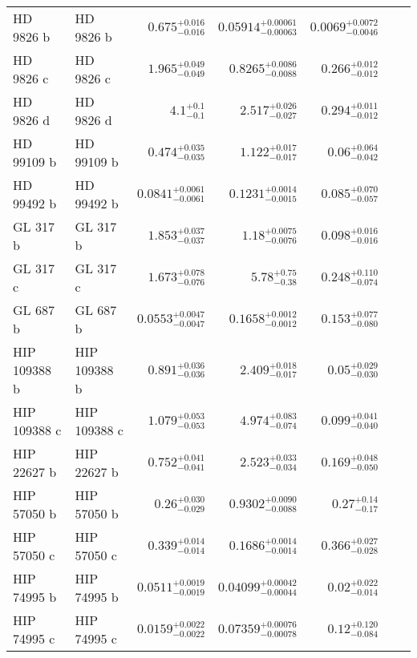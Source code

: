 \begin{longtable*}{llrrrrr}
HD 9826 b & HD 9826 b & $0.675^{+0.016}_{-0.016}$ & $0.05914^{+0.00061}_{-0.00063}$ & $0.0069^{+0.0072}_{-0.0046}$ & \cite{Butler97} & \\ 
HD 9826 c & HD 9826 c & $1.965^{+0.049}_{-0.049}$ & $0.8265^{+0.0086}_{-0.0088}$ & $0.266^{+0.012}_{-0.012}$ & \cite{Naef04} & \\ 
HD 9826 d & HD 9826 d & $4.1^{+0.1}_{-0.1}$ & $2.517^{+0.026}_{-0.027}$ & $0.294^{+0.011}_{-0.012}$ & \cite{Naef04} & \\ 
HD 99109 b & HD 99109 b & $0.474^{+0.035}_{-0.035}$ & $1.122^{+0.017}_{-0.017}$ & $0.06^{+0.064}_{-0.042}$ & \cite{Butler06} & \\ 
HD 99492 b & HD 99492 b & $0.0841^{+0.0061}_{-0.0061}$ & $0.1231^{+0.0014}_{-0.0015}$ & $0.085^{+0.070}_{-0.057}$ & \cite{Marcy05} & \\ 
GL 317 b & GL 317 b & $1.853^{+0.037}_{-0.037}$ & $1.18^{+0.0075}_{-0.0076}$ & $0.098^{+0.016}_{-0.016}$ & \cite{Johnson07b} & \\ 
GL 317 c & GL 317 c & $1.673^{+0.078}_{-0.076}$ & $5.78^{+0.75}_{-0.38}$ & $0.248^{+0.110}_{-0.074}$ & \cite{Anglada-Escude12} & \\ 
GL 687 b & GL 687 b & $0.0553^{+0.0047}_{-0.0047}$ & $0.1658^{+0.0012}_{-0.0012}$ & $0.153^{+0.077}_{-0.080}$ & \cite{Burt14} & \\ 
HIP 109388 b & HIP 109388 b & $0.891^{+0.036}_{-0.036}$ & $2.409^{+0.018}_{-0.017}$ & $0.05^{+0.029}_{-0.030}$ & \cite{Butler06_GJ849} & \\ 
HIP 109388 c & HIP 109388 c & $1.079^{+0.053}_{-0.053}$ & $4.974^{+0.083}_{-0.074}$ & $0.099^{+0.041}_{-0.040}$ & \cite{Feng15} & \\ 
HIP 22627 b & HIP 22627 b & $0.752^{+0.041}_{-0.041}$ & $2.523^{+0.033}_{-0.034}$ & $0.169^{+0.048}_{-0.050}$ & \cite{Howard10} & \\ 
HIP 57050 b & HIP 57050 b & $0.26^{+0.030}_{-0.029}$ & $0.9302^{+0.0090}_{-0.0088}$ & $0.27^{+0.14}_{-0.17}$ & \cite{Haghighipour10} & \\ 
HIP 57050 c & HIP 57050 c & $0.339^{+0.014}_{-0.014}$ & $0.1686^{+0.0014}_{-0.0014}$ & $0.366^{+0.027}_{-0.028}$ & \cite{Trifonov17} & \\ 
HIP 74995 b & HIP 74995 b & $0.0511^{+0.0019}_{-0.0019}$ & $0.04099^{+0.00042}_{-0.00044}$ & $0.02^{+0.022}_{-0.014}$ & \cite{Bonfils05} & \\ 
HIP 74995 c & HIP 74995 c & $0.0159^{+0.0022}_{-0.0022}$ & $0.07359^{+0.00076}_{-0.00078}$ & $0.12^{+0.120}_{-0.084}$ & \cite{Mayor09} & \\ 

\end{longtable*}
